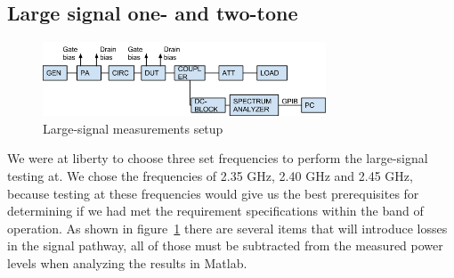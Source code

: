   \subsection{Large signal one- and two-tone}
    \begin{figure}[h]
	  \centering
	  \includegraphics[width=0.75\textwidth]{img/Large_signal_meas}
	  \caption{Large-signal measurements setup}
	  \label{fig:fig_large_meas}
    \end{figure}
	We were at liberty to choose three set frequencies to perform the large-signal testing at. We chose the frequencies of 2.35 GHz, 2.40 GHz and 2.45 GHz, because testing at these frequencies would give us the best prerequisites for determining if we had met the requirement specifications within the band of operation. As shown in figure~\ref{fig:fig_large_meas} there are several items that will introduce losses in the signal pathway, all of those must be subtracted from the measured power levels when analyzing the results in Matlab.

  
